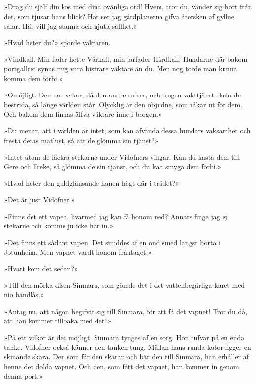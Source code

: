 »Drag du själf din kos med dina ovänliga ord! Hvem, tror du, vänder sig
bort från det, som tjusar hans blick? Här ser jag gårdplanerna gifva
återsken af gyllne salar. Här vill jag stanna och njuta sällhet.»

»Hvad heter du?» sporde väktaren.

»Vindkall. Min fader hette Vårkall, min farfader Hårdkall. Hundarne där
bakom portgallret synas mig vara bistrare väktare än du. Men nog torde
man kunna komma dem förbi.»

»Omöjligt. Den ene vakar, då den andre sofver, och trogen vakttjänst
skola de bestrida, så länge världen står. Olycklig är den objudne, som
råkar ut för dem. Och bakom dem finnas älfva väktare inne i borgen.»

»Du menar, att i världen är intet, som kan afvända dessa hundars
vaksamhet och fresta deras matlust, så att de glömma sin tjänst?»

»Intet utom de läckra stekarne under Vidofners vingar.
\protect\hypertarget{lb1625905.xhtmlux5cux23start127}{}{}\protect\hypertarget{lb1625905.xhtmlux5cux23start127-a}{}{}\protect\hypertarget{lb1625905.xhtmlux5cux23start127-b}{}{}\protect\hypertarget{lb1625905.xhtmlux5cux23start127-c}{}{}\protect\hypertarget{lb1625905.xhtmlux5cux23start127-d}{}{}
Kan du kasta dem till Gere och Freke, så glömma de sin tjänst, och du
kan smyga dem förbi.»

»Hvad heter den guldglänsande hanen högt där i trädet?»

»Det är just Vidofner.»

»Finns det ett vapen, hvarmed jag kan få honom ned? Annars finge jag ej
stekarne och komme ju icke här in.»

»Det finns ett sådant vapen. Det smiddes af en ond smed längst borta i
Jotunheim. Men vapnet vardt honom fråntaget.»

»Hvart kom det sedan?»

»Till den mörka disen Sinmara, som gömde det i det vattenbegärliga karet
med nio bandlås.»

»Antag nu, att någon begifvit sig till Sinmara, för att få det vapnet!
Tror du då, att han kommer tillbaka med det?»

»På ett vilkor är det möjligt. Sinmara tynges af en sorg. Hon rufvar på
en enda tanke. Vidofner också känner den tanken tung. Mällan hans runda
kotor ligger en skinande skära. Den som får den skäran och bär den till
Sinmara, han erhåller af henne det dolda vapnet. Och den, som fått det
vapnet, han kommer in genom denna port.»

